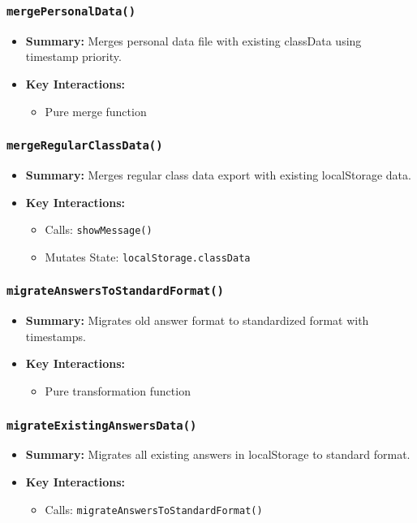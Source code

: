 \documentclass[11pt,letterpaper]{article}
\begin{document}
\subsubsection{\texttt{mergePersonalData()}}
\begin{itemize}
    \item \textbf{Summary:} Merges personal data file with existing classData using timestamp priority.
    \item \textbf{Key Interactions:}
    \begin{itemize}
        \item Pure merge function
    \end{itemize}
\end{itemize}

\subsubsection{\texttt{mergeRegularClassData()}}
\begin{itemize}
    \item \textbf{Summary:} Merges regular class data export with existing localStorage data.
    \item \textbf{Key Interactions:}
    \begin{itemize}
        \item Calls: \texttt{showMessage()}
        \item Mutates State: \texttt{localStorage.classData}
    \end{itemize}
\end{itemize}

\subsubsection{\texttt{migrateAnswersToStandardFormat()}}
\begin{itemize}
    \item \textbf{Summary:} Migrates old answer format to standardized format with timestamps.
    \item \textbf{Key Interactions:}
    \begin{itemize}
        \item Pure transformation function
    \end{itemize}
\end{itemize}

\subsubsection{\texttt{migrateExistingAnswersData()}}
\begin{itemize}
    \item \textbf{Summary:} Migrates all existing answers in localStorage to standard format.
    \item \textbf{Key Interactions:}
    \begin{itemize}
        \item Calls: \texttt{migrateAnswersToStandardFormat()}
    \end{itemize}
\end{itemize}
\end{document}

